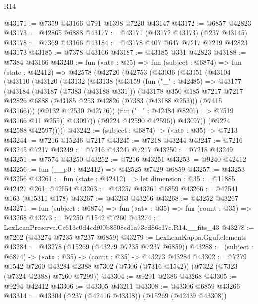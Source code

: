 \begin{lexlean}{R14}
\begin{coremodule}
@43171 := @7359 @43166 @791 @1398 @7220 @43147
@43172 := @6857 @42823
@43173 := @42865 @6888
@43177 := @43171 (@43172 @43173) (@237 @43145)
@43178 := @7369 @43166
@43184 := @43178 @407 @647 @7217 @7219 @42823 @43173
@43185 := @7378 @43166
@43187 := @43185 @331 @42823
@43188 := @7384 @43166
@43240 := fun («at» : @35) =>
  fun (subject : @6874) =>
  fun (state : @42412) =>
  @42578
    (@42720
      (@42753
        (@43036
          (@43051
            (@43104
              (@43110
                (@43120
                  (@43132
                    (@43138
                      (@43159
                        (fun ("_" : @42485) =>
                        @43177
                          (@43184
                            (@43187 (@7383 (@43188 @331)))
                            (@43178
                              @350
                              @185
                              @7217
                              @7217
                              @42826
                              @6888
                              (@43185 @253 @42826 (@7383 (@43188 @253)))
                              (@7415 @43166)))
                          (@9132 @42530 @42776))
                        (fun ("_" : @42484 @8201) => @7519 @43166 @11 @255))
                      @43097))
                  (@9224 @42590 @42596))
                @43097))
            (@9224 @42588 @42597)))))
@43242 := (subject : @6874) -> («at» : @35) -> @7213
@43244 := @7216 @15246 @7217
@43245 := @7218 @43244
@43247 := @7216 @43245 @7217
@43249 := @7216 @43247 @7217
@43250 := @7218 @43249
@43251 := @7574 @43250
@43252 := @7216 @43251
@43253 := @9240 @42412
@43256 := fun (__p0 : @42412) => @42525 @7429 @6859
@43257 := @43253 @43256
@43261 := fun (state : @42412) => let dimension : @35 := @11885 @42427 @261; @42554
@43263 := @43257 @43261 @6859
@43266 := @42541 @163 (@15311 @178)
@43267 := @43263 @43266
@43268 := @43252 @43267
@43271 := fun (subject : @6874) => fun («at» : @35) => fun (count : @35) => @43268
@43273 := @7250 @1542 @7260
@43274 := LexLeanPreserve.Cc613c0d4cdf00b8508ed1a73cd86e17c.R14.__fits_43
@43278 := @7262 (@43274 @7235 @7237 @6859)
@43279 := LexLeanKappa.Gguf.elements
@43284 := @43278 (@15269 (@43279 @7235 @7237 @6859))
@43288 := (subject : @6874) -> («at» : @35) -> (count : @35) -> @43273 @43284
@43302 := @7279
    @1542
    @7260
    @43284
    @2388
    @7302
    (@7306 (@7316 @1542))
    (@7322 (@7323 (@7324 @2388) @7260 @7299))
@43304 := @9291 @2386 @43268
@43305 := @9294 @42412
@43306 := @43305 @43261
@43308 := @43306 @6859 @43266
@43314 := @43304 (@237 (@42416 @43308)) (@15269 (@42439 @43308))

\end{coremodule}
\end{lexlean}
